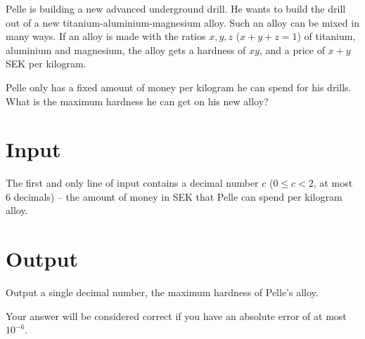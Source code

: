 Pelle is building a new advanced underground drill.
He wants to build the drill out of a new titanium-aluminium-magnesium alloy.
Such an alloy can be mixed in many ways.
If an alloy is made with the ratios $x, y, z$ ($x + y + z = 1$) of titanium, aluminium and magnesium, the alloy gets a hardness of $xy$, and a price of $x + y$ SEK per kilogram.

Pelle only has a fixed amount of money per kilogram he can spend for his drills.
What is the maximum hardness he can get on his new alloy?

\section*{Input}
The first and only line of input contains a decimal number $c$ ($0 \le c < 2$, at most 6 decimals) -- the amount of money in SEK that Pelle can spend per kilogram alloy.

\section*{Output}
Output a single decimal number, the maximum hardness of Pelle's alloy.

Your answer will be considered correct if you have an absolute error of at most ${10}^{-6}$.
